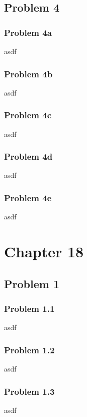\documentclass{article}
\begin{document}
\newpage
\subsection{Problem 4}
\subsubsection{Problem 4a}
asdf

\subsubsection{Problem 4b}
asdf

\subsubsection{Problem 4c}
asdf

\subsubsection{Problem 4d}
asdf

\subsubsection{Problem 4e}
asdf


\newpage
\section{\textbf{Chapter 18}}
\subsection{Problem 1}
\subsubsection{Problem 1.1}
asdf


\subsubsection{Problem 1.2}
asdf


\subsubsection{Problem 1.3}
asdf
\end{document}
